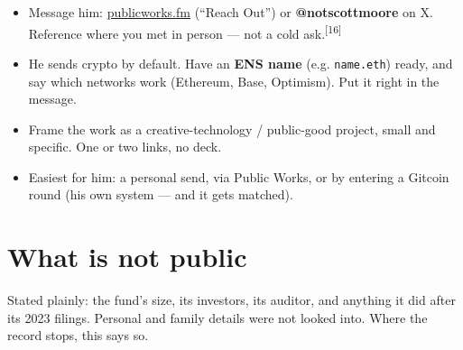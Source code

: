\documentclass[11pt]{article}
\newcommand{\refn}[1]{\textsuperscript{[#1]}}
\begin{document}
\begin{itemize}
\item Message him: \href{https://www.publicworks.fm/}{publicworks.fm}
(``Reach Out'') or \textbf{@notscottmoore} on X. Reference where you met in
person --- not a cold ask.\refn{16}
\item He sends crypto by default. Have an \textbf{ENS name} (e.g.
\texttt{name.eth}) ready, and say which networks work (Ethereum, Base,
Optimism). Put it right in the message.
\item Frame the work as a creative-technology / public-good project, small
and specific. One or two links, no deck.
\item Easiest for him: a personal send, via Public Works, or by entering a
Gitcoin round (his own system --- and it gets matched).
\end{itemize}

\section{What is not public}

Stated plainly: the fund's size, its investors, its auditor, and anything it
did after its 2023 filings. Personal and family details were not looked into.
Where the record stops, this says so.

\end{document}
